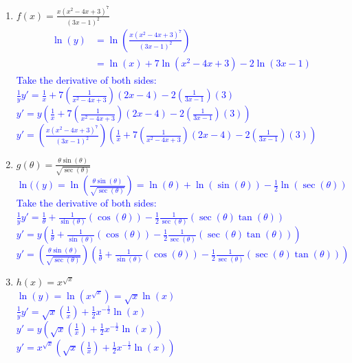 \documentclass{ximera}
\begin{document}
\begin{exercise}
\begin{enumerate}
    \item $\displaystyle f(x)=\frac{x(x^2-4x+3)^7}{(3x-1)^2}$\\
    \textcolor{blue}{ 
    \begin{align}
    \ln(y)&=\ln\left(\frac{x(x^2-4x+3)^7}{(3x-1)^2}\right)\nonumber\\
    &=\ln(x)+7\ln(x^2-4x+3)-2\ln(3x-1) \nonumber
    \end{align}
    Take the derivative of both sides:\\
    $\frac{1}{y}y'=\frac{1}{x}+7\left(\frac{1}{x^2-4x+3}\right)(2x-4)-2\left(\frac{1}{3x-1}\right)(3)$\\
    $y'=y\left(\frac{1}{x}+7\left(\frac{1}{x^2-4x+3}\right)(2x-4)-2\left(\frac{1}{3x-1}\right)(3)\right)$\\
    $y'=\left(\frac{x(x^2-4x+3)^7}{(3x-1)^2}\right)\left(\frac{1}{x}+7\left(\frac{1}{x^2-4x+3}\right)(2x-4)-2\left(\frac{1}{3x-1}\right)(3)\right)$}

    
    \item $\displaystyle g(\theta)=\frac{\theta\sin(\theta)}{\sqrt{\sec(\theta)}}$\\
    \textcolor{blue}{ $\ln((y)=\ln\left(\frac{\theta\sin(\theta)}{\sqrt{\sec(\theta)}}\right)=\ln(\theta)+\ln(\sin(\theta))-\frac12\ln(\sec(\theta))$\\
    Take the derivative of both sides:\\
    $\frac{1}{y}y'=\frac{1}{\theta}+\frac{1}{\sin(\theta)}(\cos(\theta))-\frac{1}{2}\frac{1}{\sec(\theta)}(\sec(\theta)\tan(\theta))$\\
    $y'=y\left(\frac{1}{\theta}+\frac{1}{\sin(\theta)}(\cos(\theta))-\frac{1}{2}\frac{1}{\sec(\theta)}(\sec(\theta)\tan(\theta))\right)$\\
    $y'=\left(\frac{\theta\sin(\theta)}{\sqrt{\sec(\theta)}}
\right)\left(\frac{1}{\theta}+\frac{1}{\sin(\theta)}(\cos(\theta))-\frac{1}{2}\frac{1}{\sec(\theta)}(\sec(\theta)\tan(\theta))\right)$}


    \item $\displaystyle h(x)=x^{\sqrt{x}}$   \\
    \textcolor{blue}{ $\ln(y)=\ln(x^{\sqrt{x}})=\sqrt{x}\ln(x)$\\
    $\frac{1}{y}y'=\sqrt{x}\left(\frac{1}{x}\right)+\frac{1}{2}x^{-\frac12}\ln(x)$\\
    $y'=y\left(\sqrt{x}\left(\frac{1}{x}\right)+\frac{1}{2}x^{-\frac12}\ln(x)\right)$\\
    $y'=x^{\sqrt{x}}\left(\sqrt{x}\left(\frac{1}{x}\right)+\frac{1}{2}x^{-\frac12}\ln(x)\right)$} 
    \end{enumerate}

\end{exercise}
\end{document}
